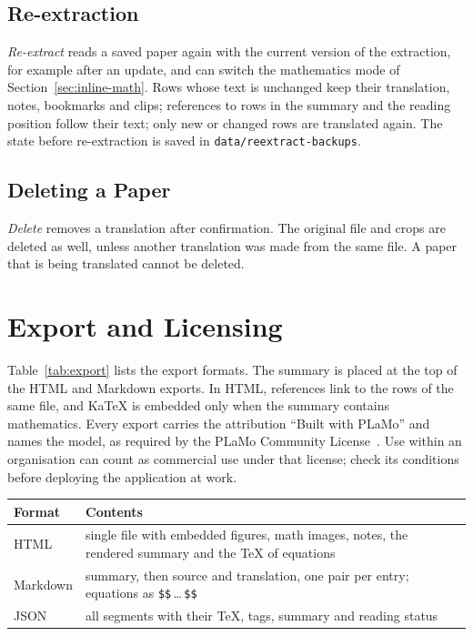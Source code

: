 \documentclass[11pt]{article}
\let\manualtable\table \let\endmanualtable\endtable
\renewenvironment{table}[1][]{\manualtable[!htbp]}{\endmanualtable}
\begin{document}
\subsection{Re-extraction}
\emph{Re-extract} reads a saved paper again with the current version of the extraction, for example after an update, and can switch the mathematics mode of Section~\ref{sec:inline-math}. Rows whose text is unchanged keep their translation, notes, bookmarks and clips; references to rows in the summary and the reading position follow their text; only new or changed rows are translated again. The state before re-extraction is saved in \texttt{data/reextract-backups}.

\subsection{Deleting a Paper}
\emph{Delete} removes a translation after confirmation. The original file and crops are deleted as well, unless another translation was made from the same file. A paper that is being translated cannot be deleted.

\section{Export and Licensing}
\label{sec:export}
Table~\ref{tab:export} lists the export formats. The summary is placed at the top of the HTML and Markdown exports. In HTML, references link to the rows of the same file, and KaTeX is embedded only when the summary contains mathematics. Every export carries the attribution ``Built with PLaMo'' and names the model, as required by the PLaMo Community License~\cite{plamolicense}. Use within an organisation can count as commercial use under that license; check its conditions before deploying the application at work.

\begin{table}[t]
  \centering
  \caption{Export formats.}
  \label{tab:export}
  \begin{tabular}{@{}lp{}@{}}
    \toprule
    Format & Contents \\
    \midrule
    HTML & single file with embedded figures, math images, notes, the rendered summary and the \TeX{} of equations \\
    Markdown & summary, then source and translation, one pair per entry; equations as \verb|$$|\,\dots\,\verb|$$| \\
    JSON & all segments with their \TeX, tags, summary and reading status \\
    \bottomrule
  \end{tabular}
\end{table}
\end{document}
